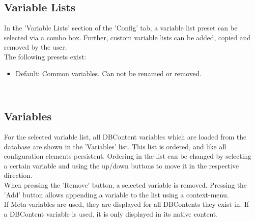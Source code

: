 \subsection{Variable Lists}

In the 'Variable Lists' section of the 'Config' tab, a variable list preset can be selected via a combo box. 
Further, custom variable lists can be added, copied and removed by the user. \\

The following presets exist:

\begin{itemize}
\item Default: Common variables. Can not be renamed or removed.
\end{itemize}
\ \\

\subsection{Variables}

For the selected variable list, all DBContent variables which are loaded from the database are shown in the 'Variables' list. 
This list is ordered, and like all configuration elements persistent. 
Ordering in the list can be changed by selecting a certain variable and using the up/down buttons to move it in the respective direction. \\

When pressing the 'Remove' button, a selected variable is removed. Pressing the 'Add' button allows appending a variable to the list using a context-menu. \\

If Meta variables are used, they are displayed for all DBContents they exist in. If a DBContent variable is used, it is only displayed in its native content.

